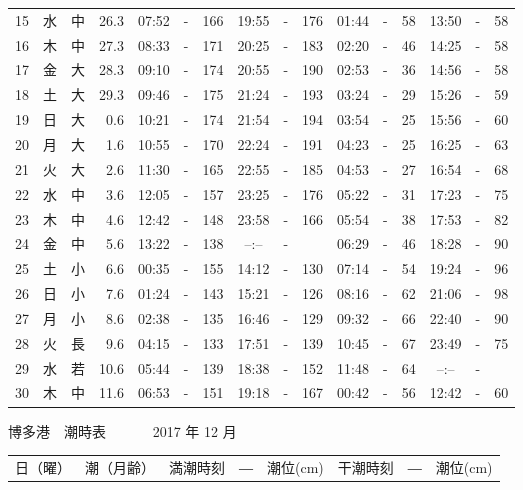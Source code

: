 \documentclass[12pt.a4j]{jsarticle}
\begin{document}
\begin{center}
\begin{table}[ht]
\begin{tabular}{|rc|cr|ccrccr|ccrccr|}
15 & 水 & 中 & 26.3 &  07:52 &-& 166  &  19:55 &-& 176  &   01:44 &-&  58  &   13:50 &-&  58  \\
16 & 木 & 中 & 27.3 &  08:33 &-& 171  &  20:25 &-& 183  &   02:20 &-&  46  &   14:25 &-&  58  \\
17 & 金 & 大 & 28.3 &  09:10 &-& 174  &  20:55 &-& 190  &   02:53 &-&  36  &   14:56 &-&  58  \\
18 & 土 & 大 & 29.3 &  09:46 &-& 175  &  21:24 &-& 193  &   03:24 &-&  29  &   15:26 &-&  59  \\
19 & 日 & 大 &  0.6 &  10:21 &-& 174  &  21:54 &-& 194  &   03:54 &-&  25  &   15:56 &-&  60  \\
20 & 月 & 大 &  1.6 &  10:55 &-& 170  &  22:24 &-& 191  &   04:23 &-&  25  &   16:25 &-&  63  \\
21 & 火 & 大 &  2.6 &  11:30 &-& 165  &  22:55 &-& 185  &   04:53 &-&  27  &   16:54 &-&  68  \\
22 & 水 & 中 &  3.6 &  12:05 &-& 157  &  23:25 &-& 176  &   05:22 &-&  31  &   17:23 &-&  75  \\
23 & 木 & 中 &  4.6 &  12:42 &-& 148  &  23:58 &-& 166  &   05:54 &-&  38  &   17:53 &-&  82  \\
24 & 金 & 中 &  5.6 &  13:22 &-& 138  &  --:-- &-&     &   06:29 &-&  46  &   18:28 &-&  90  \\
25 & 土 & 小 &  6.6 &  00:35 &-& 155  &  14:12 &-& 130  &   07:14 &-&  54  &   19:24 &-&  96  \\
26 & 日 & 小 &  7.6 &  01:24 &-& 143  &  15:21 &-& 126  &   08:16 &-&  62  &   21:06 &-&  98  \\
27 & 月 & 小 &  8.6 &  02:38 &-& 135  &  16:46 &-& 129  &   09:32 &-&  66  &   22:40 &-&  90  \\
28 & 火 & 長 &  9.6 &  04:15 &-& 133  &  17:51 &-& 139  &   10:45 &-&  67  &   23:49 &-&  75  \\
29 & 水 & 若 & 10.6 &  05:44 &-& 139  &  18:38 &-& 152  &   11:48 &-&  64  &   --:-- &-&     \\
30 & 木 & 中 & 11.6 &  06:53 &-& 151  &  19:18 &-& 167  &   00:42 &-&  56  &   12:42 &-&  60  \\
   \hline
   \end{tabular}
\end{table}
\newpage
 {\LARGE 博多港　潮時表　　　}
 {\large 2017 年 12 月}\\
 \begin{table}[ht]
    \begin{tabular}{|rc|cr|ccrccr|ccrccr|}
    \hline
    \multicolumn{2}{|c|}{日（曜）} & \multicolumn{2}{c|}{潮（月齢）} & \multicolumn{6}{c|}{満潮時刻　―　潮位(cm)} & \multicolumn{6}{c|}{干潮時刻　―　潮位(cm)} \\

\end{tabular}
\end{table}
\end{center}
\end{document}
